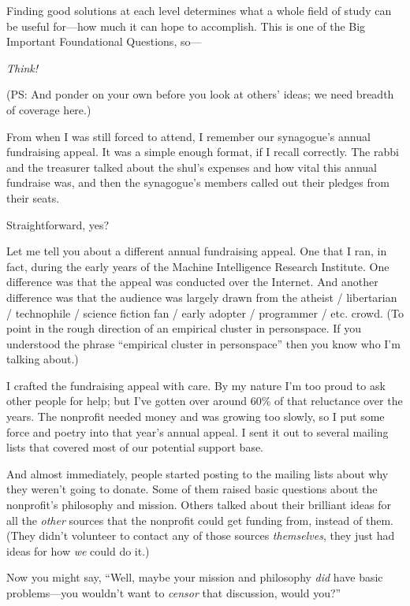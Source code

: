 {
 Finding good solutions at each level determines what a whole field
of study can be useful for---how much it can hope to accomplish. This
is one of the Big Important Foundational Questions, so---}

{
 \textit{Think!}}

{
 (PS: And ponder on your own before you look at
others' ideas; we need breadth of coverage here.)}

\myendsectiontext


{
 From when I was still forced to attend, I remember our
synagogue's annual fundraising appeal. It was a simple
enough format, if I recall correctly. The rabbi and the treasurer
talked about the shul's expenses and how vital this
annual fundraise was, and then the synagogue's members
called out their pledges from their seats. }

{
 Straightforward, yes?}

{
 Let me tell you about a different annual fundraising appeal. One
that I ran, in fact, during the early years of the Machine Intelligence
Research Institute. One difference was that the appeal was conducted
over the Internet. And another difference was that the audience was
largely drawn from the atheist / libertarian / technophile / science
fiction fan / early adopter / programmer / etc. crowd. (To point in the
rough direction of an empirical cluster in personspace. If you
understood the phrase ``empirical cluster in
personspace'' then you know who I'm
talking about.)}

{
 I crafted the fundraising appeal with care. By my nature
I'm too proud to ask other people for help; but
I've gotten over around 60\% of that reluctance over
the years. The nonprofit needed money and was growing too slowly, so I
put some force and poetry into that year's annual
appeal. I sent it out to several mailing lists that covered most of our
potential support base.}

{
 And almost immediately, people started posting to the mailing
lists about why they weren't going to donate. Some of
them raised basic questions about the nonprofit's
philosophy and mission. Others talked about their brilliant ideas for
all the \textit{other} sources that the nonprofit could get funding
from, instead of them. (They didn't volunteer to
contact any of those sources \textit{themselves}, they just had ideas
for how \textit{we} could do it.)}

{
 Now you might say, ``Well, maybe your mission and
philosophy \textit{did} have basic problems---you
wouldn't want to \textit{censor} that discussion, would
you?''}

